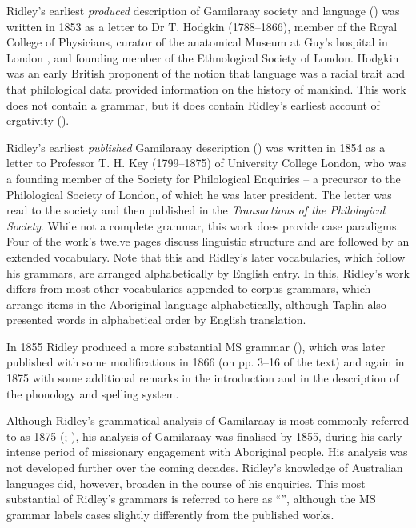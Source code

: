 \noindent
Ridley’s earliest \textit{produced} description of Gamilaraay society and language (\citeyear{ridley_kamilaroi_1856}) was written in 1853 as a letter to Dr T. Hodgkin (1788--1866), member of the Royal College of Physicians, curator of the anatomical Museum at Guy’s hospital in London \citep{martin_hodgkin_2004}, and founding member of the Ethnological Society of London. Hodgkin was an early British proponent of the notion that language was a racial trait and that philological data provided information on the history of mankind. This work does not contain a grammar, but it does contain Ridley’s earliest account of ergativity ().

Ridley’s earliest \textit{published} Gamilaraay description (\citeyear{ridley_kamilaroi_1855-1}) was written in 1854 as a letter to Professor T. H. Key (1799--1875) of University College London, who was a founding member of the Society for Philological Enquiries – a precursor to the Philological Society of London, of which he was later president. The letter was read to the society and then published in the \textit{Transactions of the Philological Society}. While not a complete grammar, this work does provide case paradigms. Four of the work’s twelve pages discuss linguistic structure and are followed by an extended vocabulary. Note that this and Ridley’s later vocabularies, which follow his grammars, are arranged alphabetically by English entry. In this, Ridley’s work differs from most other vocabularies appended to corpus grammars, which arrange items in the Aboriginal language alphabetically, although Taplin also presented words in alphabetical order by English translation.

In 1855 Ridley produced a more substantial MS grammar (\citeyear{ridley_kamilaroi_1855}), which was later published with some modifications in 1866 (on pp. 3--16 of the text) and again in 1875 with some additional remarks in the introduction and in the description of the phonology and spelling system. 

Although Ridley’s grammatical analysis of Gamilaraay is most commonly referred to as 1875 (\citealt{austin_gamilaraay_2008}; \citealt{giacon_2014}), his analysis of Gamilaraay was finalised by 1855, during his early intense period of missionary engagement with Aboriginal people. His analysis was not developed further over the coming decades. Ridley’s knowledge of Australian languages did, however, broaden in the course of his enquiries. This most substantial of Ridley’s grammars is referred to here as ``\citet{ridley_kamilaroi_1875}'', although the MS grammar \citep{ridley_kamilaroi_1855} labels cases slightly differently from the published works.

